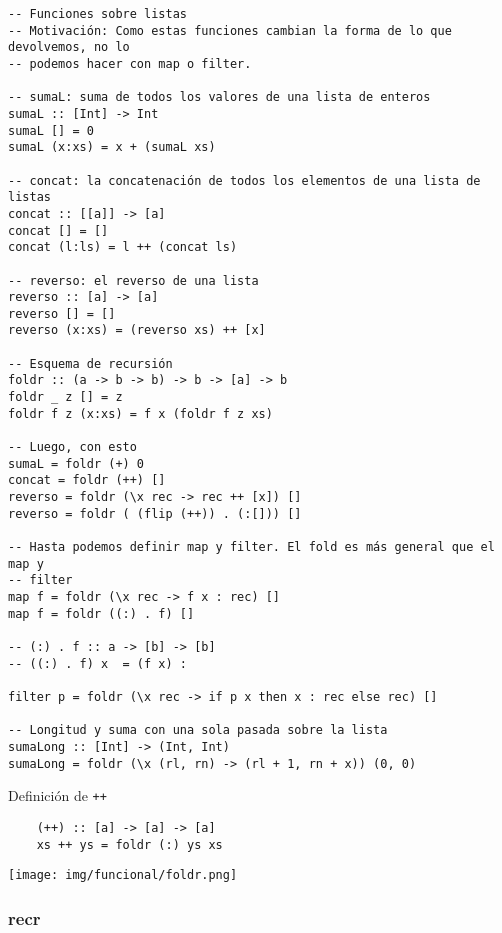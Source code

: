 \documentclass{report}
\theoremstyle{definition} %
\begin{document}
\begin{verbatim}
-- Funciones sobre listas
-- Motivación: Como estas funciones cambian la forma de lo que devolvemos, no lo
-- podemos hacer con map o filter.

-- sumaL: suma de todos los valores de una lista de enteros
sumaL :: [Int] -> Int
sumaL [] = 0
sumaL (x:xs) = x + (sumaL xs)

-- concat: la concatenación de todos los elementos de una lista de listas
concat :: [[a]] -> [a]
concat [] = []
concat (l:ls) = l ++ (concat ls)

-- reverso: el reverso de una lista
reverso :: [a] -> [a]
reverso [] = []
reverso (x:xs) = (reverso xs) ++ [x]

-- Esquema de recursión
foldr :: (a -> b -> b) -> b -> [a] -> b
foldr _ z [] = z
foldr f z (x:xs) = f x (foldr f z xs)

-- Luego, con esto
sumaL = foldr (+) 0
concat = foldr (++) []
reverso = foldr (\x rec -> rec ++ [x]) []
reverso = foldr ( (flip (++)) . (:[])) []

-- Hasta podemos definir map y filter. El fold es más general que el map y
-- filter
map f = foldr (\x rec -> f x : rec) []
map f = foldr ((:) . f) []

-- (:) . f :: a -> [b] -> [b]
-- ((:) . f) x  = (f x) :

filter p = foldr (\x rec -> if p x then x : rec else rec) []

-- Longitud y suma con una sola pasada sobre la lista
sumaLong :: [Int] -> (Int, Int)
sumaLong = foldr (\x (rl, rn) -> (rl + 1, rn + x)) (0, 0)
\end{verbatim}

Definición de \texttt{++}
\begin{verbatim}
    (++) :: [a] -> [a] -> [a]
    xs ++ ys = foldr (:) ys xs
\end{verbatim}

\begin{center}
    \texttt{[image: img/funcional/foldr.png]}
\end{center}

\subsubsection{recr}
\end{document}

